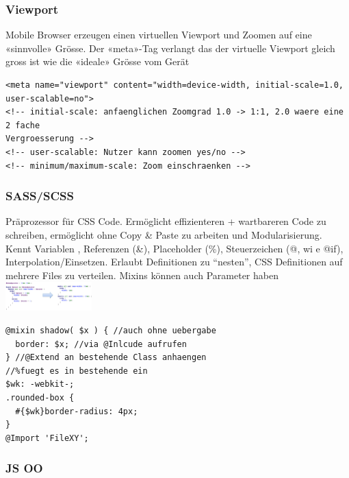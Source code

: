 \begin{multicols*}{4}
\subsubsection{Viewport}
Mobile Browser erzeugen einen virtuellen Viewport und Zoomen auf eine «sinnvolle» Grösse. 
Der «meta»-Tag 
verlangt das der virtuelle Viewport gleich gross ist wie die «ideale» Grösse vom Gerät
 \begin{verbatim}
<meta name="viewport" content="width=device-width, initial-scale=1.0, 
user-scalable=no">
<!-- initial-scale: anfaenglichen Zoomgrad 1.0 -> 1:1, 2.0 waere eine 2 fache 
Vergroesserung -->
<!-- user-scalable: Nutzer kann zoomen yes/no -->
<!-- minimum/maximum-scale: Zoom einschraenken -->
\end{verbatim}

\subsubsection{SASS/SCSS}
Präprozessor für CSS Code. Ermöglicht effizienteren + wartbareren Code zu schreiben, 
ermöglicht ohne Copy \& Paste zu arbeiten und Modularisierung. Kennt Variablen , 
Referenzen (\&), Placeholder (\%), Steuerzeichen (@, wi e @if), Interpolation/Einsetzen. 
Erlaubt Definitionen zu 
“nesten”, CSS Definitionen auf mehrere Files zu verteilen. 
Mixins können auch Parameter haben
\includegraphics[width=0.25\textwidth]{images/scssloop}
 \begin{verbatim}
@mixin shadow( $x ) { //auch ohne uebergabe
  border: $x; //via @Inlcude aufrufen
} //@Extend an bestehende Class anhaengen
//%fuegt es in bestehende ein
$wk: -webkit-;
.rounded-box {
  #{$wk}border-radius: 4px;
}
@Import 'FileXY';
 \end{verbatim}
\subsubsection{JS OO}

\end{multicols*}
